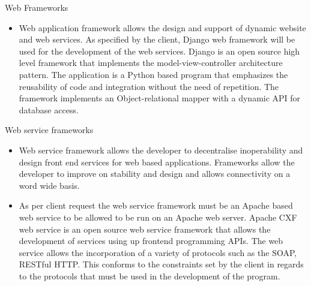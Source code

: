 \documentclass[12pt]{article}
\begin{document}
							 Web Frameworks
							\begin{itemize}
								\item Web application framework allows the design and support of dynamic website and web services. As specified by the client, Django web framework will be used for the development of the web services. Django is an open source high level framework that implements the model-view-controller architecture pattern. The application is a Python based program that emphasizes the reusability of code and integration without the need of repetition. The framework implements an Object-relational mapper with a dynamic API for database access.
								
							\end{itemize}
							 Web service frameworks
							\begin{itemize}
							\item Web service framework allows the developer to decentralise inoperability and design front end services for web based applications. Frameworks allow the developer to improve on stability and design and allows connectivity on a word wide basis.
							\item As per client request the web service framework must be an Apache based web service to be allowed to be run on an Apache web server. Apache CXF web service is an open source web service framework that allows the development of services using up frontend programming APIs. The web service allows the incorporation of a variety of protocols such as the SOAP, RESTful HTTP. This conforms to the constraints set by the client in regards to the protocols that must be used in the development of the program.
							
							\end{itemize}
					\vspace{0.2in}	
			
		
\end{document}
